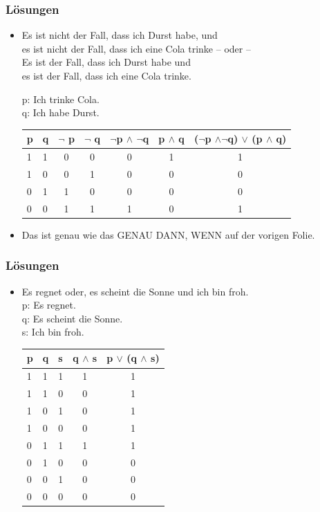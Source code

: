 {\begin{frame}
\end{frame}

\begin{frame}
\frametitle{Lösungen}


%	
\begin{itemize}
\item[] 
Es ist nicht der Fall, dass ich Durst habe, und\\
es ist nicht der Fall, dass ich eine Cola trinke -- oder -- \\
Es ist der Fall, dass ich Durst habe und\\
es ist der Fall, dass ich eine Cola trinke.\\

\medskip

p: Ich trinke Cola.\\
q: Ich habe Durst.

\bigskip

\begin{tabular}{l|l|c|c|c|c|c}
p & q & $\lnot$ p & $\lnot$ q & $ \lnot $p $ \land$ $\lnot $q & p $ \land $ q & ($ \lnot $p $ \land \lnot $q) $ \lor $ (p $ \land $ q)\\
\hline
1 & 1 & 0& 0 & 0 & 1 & 1\\
\hline
1 & 0 & 0 & 1 &  0 & 0 & 0\\
\hline
0 & 1 & 1 & 0 & 0 & 0 & 0\\
\hline
0 & 0 & 1 & 1 & 1 & 0 & 1\\
\end{tabular}

\bigskip

\item[] Das ist genau wie das GENAU DANN, WENN auf der vorigen Folie.

\end{itemize}

\end{frame}

\begin{frame}
\frametitle{Lösungen}

\begin{itemize}
\item[] Es regnet oder, es scheint die Sonne und ich bin froh.\\		
p: Es regnet.\\
q: Es scheint die Sonne.\\
s: Ich bin froh.

\bigskip

\begin{tabular}{l|l|l|c|c}
p & q & s & q $\land $ s & p $\lor$ (q $\land $ s) \\
\hline
1 & 1 & 1 & 1 & 1\\
\hline
1 & 1 & 0 & 0 & 1\\
\hline
1 & 0 & 1 & 0 & 1\\
\hline
1 & 0 & 0 & 0 & 1\\
\hline
0 & 1 & 1 & 1 & 1\\
\hline
0 & 1 & 0 & 0 & 0\\
\hline
0 & 0 & 1 & 0 & 0\\
\hline
0 & 0 & 0 & 0 & 0\\
\end{tabular}


\end{itemize}
\end{frame}}
